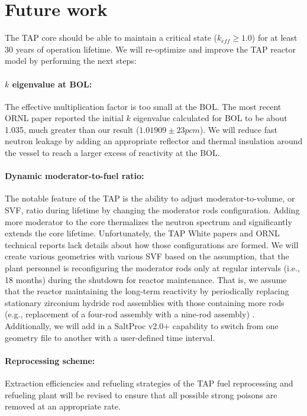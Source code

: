\documentclass[12pt]{article} %
\begin{document}
\section{Future work}
The \gls{TAP} core should be able to maintain a critical state ($k_{eff}\geq 
1.0$) for at least 30 years of operation lifetime. We will re-optimize and 
improve the \gls{TAP} reactor model by performing the next steps:
\paragraph{$k$ eigenvalue at \gls{BOL}:} The effective multiplication factor 
is too small at the \gls{BOL}. The most recent \gls{ORNL} paper  
\cite{betzler_fuel_2018} reported the initial $k$ eigenvalue calculated 
for \gls{BOL} to be about 1.035, much greater than our result 
($1.01909\pm23pcm$). We will reduce fast neutron leakage by adding an 
appropriate reflector and thermal insulation around the vessel to reach a 
larger excess of reactivity at the \gls{BOL}.
\paragraph{Dynamic moderator-to-fuel ratio:} The notable feature of the 
\gls{TAP} is the ability to adjust moderator-to-volume, or \gls{SVF}, ratio 
during lifetime by changing the moderator rods configuration. Adding more 
moderator to the core thermalizes the neutron spectrum and significantly 
extends the core lifetime. Unfortunately, the \gls{TAP} White 
papers and \gls{ORNL} technical reports lack details about how those 
configurations are formed. We will create various geometries with various 
\gls{SVF} based on the assumption, that the plant personnel is reconfiguring 
the moderator rods only at regular intervals (i.e., 18 months) during the 
shutdown for reactor maintenance. That is, we assume that the reactor 
maintaining the long-term reactivity by periodically replacing stationary
zirconium hydride rod assemblies with those containing more rods (e.g., 
replacement of a four-rod assembly with a nine-rod assembly)  
\cite{betzler_fuel_2018}. Additionally, we will add in a SaltProc v2.0+ 
capability to switch from one geometry file to another with a user-defined 
time interval. 
\paragraph{Reprocessing scheme:} Extraction efficiencies and refueling 
strategies of the \gls{TAP} fuel reprocessing and refueling plant will be 
revised to ensure that all possible strong poisons are removed at an 
appropriate rate.




%

\end{document}
